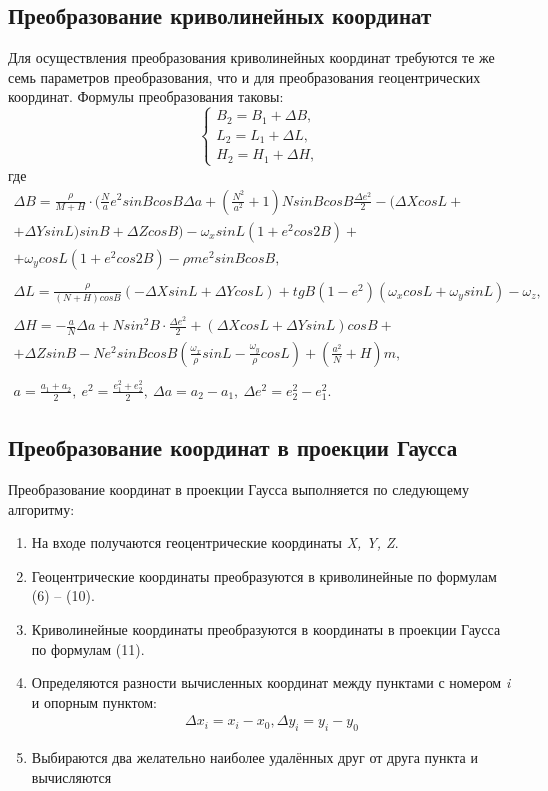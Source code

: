 \documentclass[12pt]{report}
\begin{document}
\subsection*{Преобразование криволинейных координат}
Для осуществления преобразования криволинейных координат требуются те же семь параметров преобразования, что и для преобразования геоцентрических координат. Формулы преобразования таковы:
\begin{equation}
\begin{cases}
B_2 = B_1 + \Delta B,\\
L_2 = L_1 + \Delta L,\\
H_2 = H_1 + \Delta H,
\end{cases}
\end{equation}
где
\begin{eqnarray*}
\Delta B = \frac{\rho}{M + H} \cdot
 ( \frac {N} {a} e^2 sin B cos B \Delta a + (\frac{N^2}{a^2} + 1)N sin B cos B \frac {\Delta e^2}{2} - (\Delta X cos L + \\ + \Delta Y sin L) sin B + \Delta Z cos B ) - \omega_x sin L(1 + e^2 cos2B) + \\ +  \omega_y cosL (1 + e^2 cos 2B) - \rho m e^2 sin B cos B,
\\
\\
\Delta L = \frac {\rho}{(N + H)cos B}(-\Delta X sin L + \Delta Y cos L) + tg B(1 - e^2)(\omega_x cos L + \omega_y sin L) - \omega_z,
\\
\\
\Delta H = - \frac{a}{N} \Delta a + N sin^2 B \cdot \frac{\Delta e^2}{2} + (\Delta X cos L + \Delta Y sin L)cos B +\\+\Delta Z sin B - N e^2 sin B cos B (\frac{\omega_x}{\rho}sin L - \frac{\omega_y}{\rho} cos L)+(\frac{a^2}{N} + H)m,
\\
\\
a = \frac{a_1 + a_2}{2}, \  e^2 = \frac {e^2_1 + e^2_2}{2}, \  \Delta a = a_2 - a_1, \ \Delta e^2 = e^2_2 - e^2_1.
\end{eqnarray*}
\subsection*{Преобразование координат в проекции Гаусса}
Преобразование координат в проекции Гаусса выполняется по следующему алгоритму:
\begin{enumerate}
\item На входе получаются геоцентрические координаты  \textit{X, Y, Z}.
\item  Геоцентрические координаты преобразуются в криволинейные по формулам (6) -- (10).
\item  Криволинейные координаты преобразуются в координаты в проекции Гаусса по формулам (11).
\item  Определяются разности вычисленных координат между пунктами с номером \textit{i} и опорным пунктом:
\begin{eqnarray}
\Delta x_i = x_i - x_0,  \Delta y_i = y_i - y_0
\end{eqnarray}
\item Выбираются два желательно наиболее удалённых друг от друга пункта и вычисляются
\end{enumerate}
\end{document}
